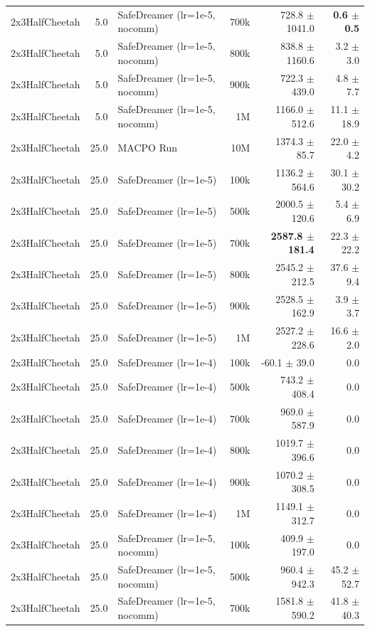 \begin{longtable}{l r l r r r}
2x3HalfCheetah & 5.0 & SafeDreamer (lr=1e-5, nocomm) & 700k & 728.8 $\pm$ 1041.0 & \textbf{0.6 $\pm$ 0.5} \\
2x3HalfCheetah & 5.0 & SafeDreamer (lr=1e-5, nocomm) & 800k & 838.8 $\pm$ 1160.6 & 3.2 $\pm$ 3.0 \\
2x3HalfCheetah & 5.0 & SafeDreamer (lr=1e-5, nocomm) & 900k & 722.3 $\pm$ 439.0 & 4.8 $\pm$ 7.7 \\
2x3HalfCheetah & 5.0 & SafeDreamer (lr=1e-5, nocomm) & 1M & 1166.0 $\pm$ 512.6 & 11.1 $\pm$ 18.9 \\
\midrule
2x3HalfCheetah & 25.0 & MACPO Run & 10M & 1374.3 $\pm$ 85.7 & 22.0 $\pm$ 4.2 \\
2x3HalfCheetah & 25.0 & SafeDreamer (lr=1e-5) & 100k & 1136.2 $\pm$ 564.6 & 30.1 $\pm$ 30.2 \\
2x3HalfCheetah & 25.0 & SafeDreamer (lr=1e-5) & 500k & 2000.5 $\pm$ 120.6 & 5.4 $\pm$ 6.9 \\
2x3HalfCheetah & 25.0 & SafeDreamer (lr=1e-5) & 700k & \textbf{2587.8 $\pm$ 181.4} & 22.3 $\pm$ 22.2 \\
2x3HalfCheetah & 25.0 & SafeDreamer (lr=1e-5) & 800k & 2545.2 $\pm$ 212.5 & 37.6 $\pm$ 9.4 \\
2x3HalfCheetah & 25.0 & SafeDreamer (lr=1e-5) & 900k & 2528.5 $\pm$ 162.9 & 3.9 $\pm$ 3.7 \\
2x3HalfCheetah & 25.0 & SafeDreamer (lr=1e-5) & 1M & 2527.2 $\pm$ 228.6 & 16.6 $\pm$ 2.0 \\
2x3HalfCheetah & 25.0 & SafeDreamer (lr=1e-4) & 100k & -60.1 $\pm$ 39.0 & 0.0 \\
2x3HalfCheetah & 25.0 & SafeDreamer (lr=1e-4) & 500k & 743.2 $\pm$ 408.4 & 0.0 \\
2x3HalfCheetah & 25.0 & SafeDreamer (lr=1e-4) & 700k & 969.0 $\pm$ 587.9 & 0.0 \\
2x3HalfCheetah & 25.0 & SafeDreamer (lr=1e-4) & 800k & 1019.7 $\pm$ 396.6 & 0.0 \\
2x3HalfCheetah & 25.0 & SafeDreamer (lr=1e-4) & 900k & 1070.2 $\pm$ 308.5 & 0.0 \\
2x3HalfCheetah & 25.0 & SafeDreamer (lr=1e-4) & 1M & 1149.1 $\pm$ 312.7 & 0.0 \\
2x3HalfCheetah & 25.0 & SafeDreamer (lr=1e-5, nocomm) & 100k & 409.9 $\pm$ 197.0 & 0.0 \\
2x3HalfCheetah & 25.0 & SafeDreamer (lr=1e-5, nocomm) & 500k & 960.4 $\pm$ 942.3 & 45.2 $\pm$ 52.7 \\
2x3HalfCheetah & 25.0 & SafeDreamer (lr=1e-5, nocomm) & 700k & 1581.8 $\pm$ 590.2 & 41.8 $\pm$ 40.3 \\

\end{longtable}
